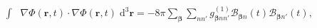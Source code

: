 \documentclass{article}
\begin{document}
\begin{equation}
\begin{split}
\int&\nabla\Phi(\mathbf{r},t)\cdot\nabla\Phi(\mathbf{r},t)\;\mathrm{d}^3\mathbf{r}
= -8\pi\sum_{\bm{\beta}}\sum_{nn'}g_{\bm{\beta}nn'}^{(1)}\mathcal{B}_{\bm{\beta}n}(t)\mathcal{B}_{\bm{\beta}n'}(t),
\end{split}
\end{equation}
\end{document}

